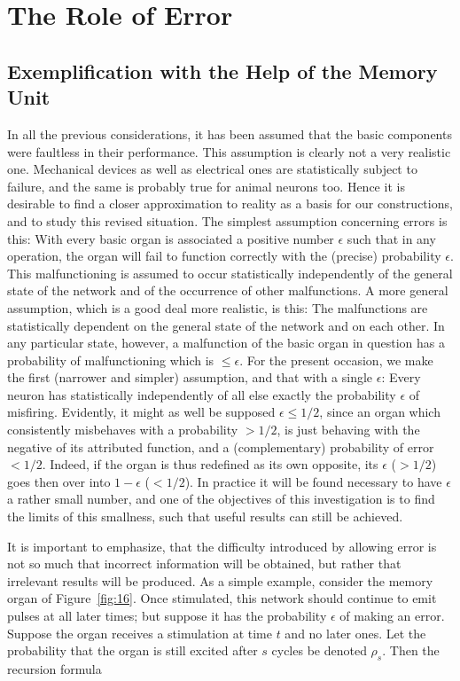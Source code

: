\documentclass[twocolumn,preprintnumbers,amsmath,amssymb,floatfix]{revtex4}
\begin{document}
\section{\label{sec:seven}The Role of Error}

\subsection{\label{sec:seven1}Exemplification with the Help of the Memory Unit}

In all the previous considerations, it has been assumed that the
basic components were faultless in their performance. This
assumption is clearly not a very realistic one. Mechanical devices
as well as electrical ones are statistically subject to failure,
and the same is probably true for animal neurons too. Hence it is
desirable to find a closer approximation to reality as a basis for
our constructions, and to study this revised situation. The
simplest assumption concerning errors is this: With every basic
organ is associated a positive number $\epsilon$ such that in any
operation, the organ will fail to function correctly with the
(precise) probability $\epsilon$. This malfunctioning is assumed
to occur statistically independently of the general state of the
network and of the occurrence of other malfunctions. A more
general assumption, which is a good deal more realistic, is this:
The malfunctions are statistically dependent on the general state
of the network and on each other. In any particular state,
however, a malfunction of the basic organ in question has a
probability of malfunctioning which is $\leq \epsilon$. For the
present occasion, we make the first (narrower and simpler)
assumption, and that with a single $\epsilon$: Every neuron has
statistically independently of all else exactly the probability
$\epsilon$ of misfiring. Evidently, it might as well be supposed
$\epsilon \leq 1/2$, since an organ which consistently misbehaves
with a probability $> 1/2$, is just behaving with the negative of
its attributed function, and a (complementary) probability of
error $< 1/2$. Indeed, if the organ is thus redefined as its own
opposite, its $\epsilon$ ($> 1/2$) goes then over into
$1-\epsilon$ ($< 1/2$). In practice it will be found necessary to
have $\epsilon$ a rather small number, and one of the objectives
of this investigation is to find the limits of this smallness,
such that useful results can still be achieved.

It is important to emphasize, that the difficulty introduced by
allowing error is not so much that incorrect information will be
obtained, but rather that irrelevant results will be produced. As
a simple example, consider the memory organ of
Figure~\ref{fig:16}. Once stimulated, this network should continue
to emit pulses at all later times; but suppose it has the
probability $\epsilon$ of making an error. Suppose the organ
receives a stimulation at time $t$ and no later ones. Let the
probability that the organ is still excited after $s$ cycles be
denoted $\rho_s$. Then the recursion formula
\end{document}
